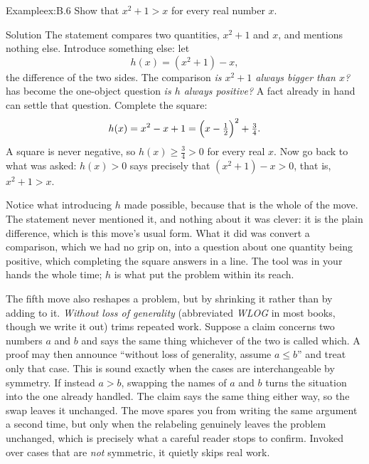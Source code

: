 \documentclass[a4paper,12pt,oneside]{memoir}
\begin{document}
\begin{workedexample}
\begin{envexample}{Example}{ex:B.6}{}
Show that \(x^{2} + 1 > x\) for every real number \(x\).
\end{envexample}
\begin{envsolution}{Solution}{}{}
The statement compares two quantities, \(x^{2} + 1\) and \(x\), and mentions nothing else. Introduce something else: let \[ h(x) = (x^{2} + 1) - x, \] the difference of the two sides. The comparison \emph{is \(x^{2}+1\) always bigger than \(x\)?} has become the one-object question \emph{is \(h\) always positive?} A fact already in hand can settle that question. Complete the square: \[ h(x) = x^{2} - x + 1 = \Bigl(x - \tfrac{1}{2}\Bigr)^{2} + \tfrac{3}{4}. \] A square is never negative, so \(h(x) \ge \tfrac{3}{4} > 0\) for every real \(x\). Now go back to what was asked: \(h(x) > 0\) says precisely that \((x^{2} + 1) - x > 0\), that is, \(x^{2} + 1 > x\).

Notice what introducing \(h\) made possible, because that is the whole of the move. The statement never mentioned it, and nothing about it was clever: it is the plain difference, which is this move’s usual form. What it did was convert a comparison, which we had no grip on, into a question about one quantity being positive, which completing the square answers in a line. The tool was in your hands the whole time; \(h\) is what put the problem within its reach.
\end{envsolution}
\end{workedexample}
The fifth move also reshapes a problem, but by shrinking it rather than by adding to it. \emph{Without loss of generality} (abbreviated \emph{WLOG} in most books, though we write it out) trims repeated work. Suppose a claim concerns two numbers \(a\) and \(b\) and says the same thing whichever of the two is called which. A proof may then announce “without loss of generality, assume \(a \le b\)” and treat only that case. This is sound exactly when the cases are interchangeable by symmetry. If instead \(a > b\), swapping the names of \(a\) and \(b\) turns the situation into the one already handled. The claim says the same thing either way, so the swap leaves it unchanged. The move spares you from writing the same argument a second time, but only when the relabeling genuinely leaves the problem unchanged, which is precisely what a careful reader stops to confirm. Invoked over cases that are \emph{not} symmetric, it quietly skips real work.
\end{document}
